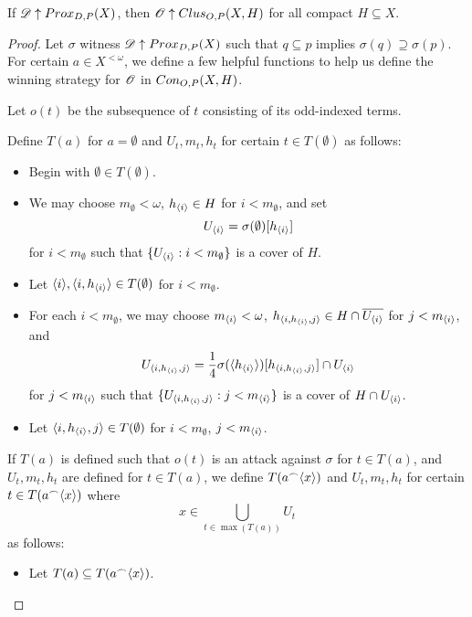 \begin{theorem}
  If $\mathscr{D} \uparrow Prox_{D,P}(X)$, then $\mathscr{O}\uparrow Clus_{O,P}(X,H)$ for all compact $H\subseteq X$.
\end{theorem}

\begin{proof}
  Let $\sigma$ witness $\mathscr{D} \uparrow Prox_{D,P}(X)$ such that $q\subseteq p$ implies $\sigma(q)\supseteq\sigma(p)$. For certain $a\in X^{<\omega}$, we define a few helpful functions to help us define the winning strategy for $\mathscr{O}$ in $Con_{O,P}(X,H)$.

  Let $o(t)$ be the subsequence of $t$ consisting of its odd-indexed terms.

  Define $T(a)$ for $a=\emptyset$ and $U_t,m_t,h_t$ for certain $t\in T(\emptyset)$ as follows:
        \begin{itemize}
          \item Begin with $\emptyset\in T(\emptyset)$.
          \item We may choose $m_{\emptyset}<\omega$, $h_{\langle i\rangle}\in H$ for $i<m_{\emptyset}$, and set
            \[
              U_{\langle i\rangle}
                =
              \sigma(\emptyset)[h_{\langle i\rangle}]
            \]
            for $i<m_{\emptyset}$ such that $\{U_{\langle i\rangle}:i<m_{\emptyset}\}$ is a cover of $H$.
          \item Let $\langle i\rangle,\langle i,h_{\langle i\rangle}\rangle\in T(\emptyset)$ for $i<m_{\emptyset}$.
          \item For each $i<m_{\emptyset}$, we may choose $m_{\langle i\rangle}<\omega$, $h_{\langle i,h_{\langle i\rangle},j\rangle}\in H\cap\overline{U_{\langle i\rangle}}$ for $j<m_{\langle i\rangle}$, and 
            \[
              U_{\langle i,h_{\langle i\rangle},j\rangle}
                =
              \frac{1}{4}\sigma(\langle h_{\langle i\rangle}\rangle)[h_{\langle i,h_{\langle i\rangle},j\rangle}]
                \cap 
              U_{\langle i\rangle}
            \]
            for $j<m_{\langle i\rangle}$ such that $\{U_{\langle i,h_{\langle i\rangle},j\rangle}:j<m_{\langle i\rangle}\}$ is a cover of $H\cap U_{\langle i\rangle}$.
          \item Let $\langle i,h_{\langle i\rangle},j\rangle\in T(\emptyset)$ for $i<m_{\emptyset}$, $j<m_{\langle i\rangle}$.
        \end{itemize}
  If $T(a)$ is defined such that $o(t)$ is an attack against $\sigma$ for $t\in T(a)$, and $U_t,m_t,h_t$ are defined for $t\in T(a)$, we define $T(a^\frown\langle x\rangle)$ and $U_t,m_t,h_t$ for certain $t\in T(a^\frown\langle x\rangle)$ where 
        \[
          x\in \bigcup_{t\in\max(T(a))}U_t
        \]
  as follows:
        \begin{itemize}
          \newcommand{\thet}{{t_x}}
          \item Let $T(a)\subseteq T(a^\frown\langle x\rangle)$.

\end{itemize}
\end{proof}

